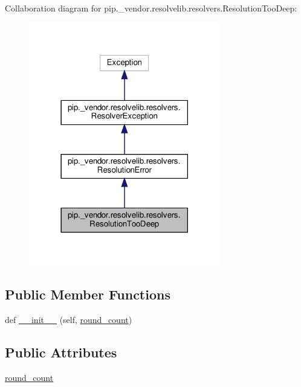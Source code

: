 Collaboration diagram for pip.\+\_\+vendor.\+resolvelib.\+resolvers.\+Resolution\+Too\+Deep\+:
\nopagebreak
\begin{figure}[H]
\begin{center}
\leavevmode
\includegraphics[width=237pt]{classpip_1_1__vendor_1_1resolvelib_1_1resolvers_1_1ResolutionTooDeep__coll__graph}
\end{center}
\end{figure}
\subsection*{Public Member Functions}
\begin{DoxyCompactItemize}
\item 
def \hyperlink{classpip_1_1__vendor_1_1resolvelib_1_1resolvers_1_1ResolutionTooDeep_abff8b6a54dd2a46677182b807333d2d8}{\+\_\+\+\_\+init\+\_\+\+\_\+} (self, \hyperlink{classpip_1_1__vendor_1_1resolvelib_1_1resolvers_1_1ResolutionTooDeep_a7a95c3562a90849132620f58efbc7909}{round\+\_\+count})
\end{DoxyCompactItemize}
\subsection*{Public Attributes}
\begin{DoxyCompactItemize}
\item 
\hyperlink{classpip_1_1__vendor_1_1resolvelib_1_1resolvers_1_1ResolutionTooDeep_a7a95c3562a90849132620f58efbc7909}{round\+\_\+count}
\end{DoxyCompactItemize}


